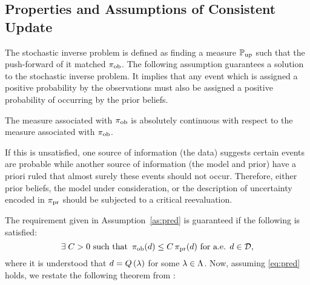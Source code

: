 
\subsection{Properties and Assumptions of Consistent Update}\label{sec:properties}
The stochastic inverse problem is defined as finding a measure $\operatorname*{\mathbb{P}_{up}}$ such that the push-forward of it matched $\operatorname*{\pi_{ob}}$.
The following assumption guarantees a solution to the stochastic inverse problem. 
It implies that any event which is assigned a positive probability by the observations must also be assigned a positive probability of occurring by the prior beliefs. 

\begin{assumption}\label{as:pred}
The measure associated with $\operatorname*{\pi_{ob}}$ is absolutely continuous with respect to the measure associated with $\operatorname*{\pi_{ob}}$.
\end{assumption}

If this is unsatisfied, one source of information (the data) suggests certain events are probable while another source of information (the model and prior) have a priori ruled that almost surely these events should not occur. 
Therefore, either prior beliefs, the model under consideration, or the description of uncertainty encoded in $\operatorname*{\pi_{pr}}$ should be subjected to a critical reevaluation. 


The requirement given in Assumption~\ref{as:pred} is guaranteed if the following is satisfied:
\begin{equation}\label{eq:pred}
\exists \; C>0 \text{ such that } \operatorname*{\pi_{ob}} (d) \leq C \operatorname*{\pi_{pr}}(d) \text{ for a.e. } d\in \mathcal{D},
\end{equation}
where it is understood that $d = Q\left ( \lambda \right )$ for some $\lambda \in {\Lambda}$.
Now, assuming \eqref{eq:pred} holds, we restate the following theorem from \cite{BJW18}:



%

